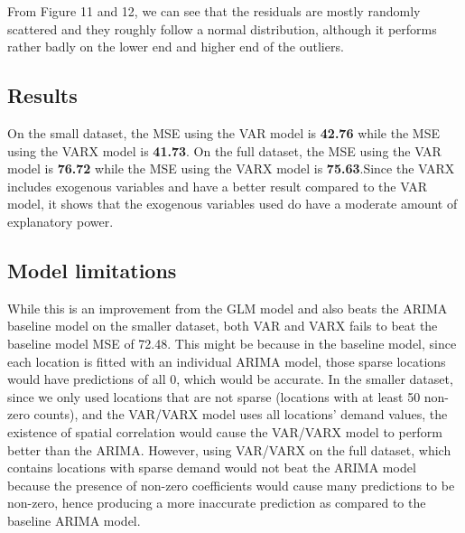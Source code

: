 \documentclass[12pt, letterpaper] {article}
\begin{document}
\noindent From Figure 11 and 12, we can see that the residuals are mostly randomly scattered and they roughly follow a normal distribution, although it performs rather badly on the lower end and higher end of the outliers. 


%
%
%

\subsection{Results}
On the small dataset, the MSE using the VAR model is \textbf{42.76} while the MSE using the VARX model is \textbf{41.73}. On the full dataset, the MSE using the VAR model  is \textbf{76.72} while the MSE using the VARX model is \textbf{75.63}.Since the VARX includes exogenous variables and have a better result compared to the VAR model, it shows that the exogenous variables used do have a moderate amount of explanatory power. 

\subsection{Model limitations}

While this is an improvement from the GLM model and also beats the ARIMA baseline model on the smaller dataset, both VAR and VARX fails to beat the baseline model MSE of 72.48. This might be because in the baseline model, since each location is fitted with an individual ARIMA model, those sparse locations would have predictions of all 0, which would be accurate. In the smaller dataset, since we only used locations that are not sparse (locations with at least 50 non-zero counts), and the VAR/VARX model uses all locations' demand values, the existence of spatial correlation would cause the VAR/VARX model to perform better than the ARIMA. However, using VAR/VARX on the full dataset, which contains locations with sparse demand would not beat the ARIMA model because the presence of non-zero coefficients would cause many predictions to be non-zero, hence producing a more inaccurate prediction as compared to the baseline ARIMA model. 
\end{document}
